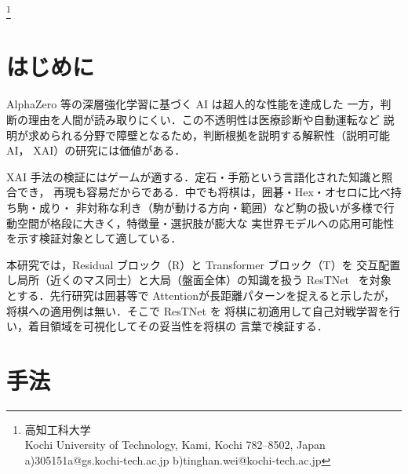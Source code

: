 \documentclass[a4paper,10pt,twocolumn]{ltjsarticle}
\newcommand{\blfootnote}[1]{%
  \begingroup
  \renewcommand\thefootnote{}\footnote{#1}%
  \addtocounter{footnote}{-1}%
  \endgroup}
\begin{document}

\blfootnote{\quad 高知工科大学\\
\phantom{1\quad}Kochi University of Technology, Kami, Kochi 782--8502, Japan\\
a)\quad 305151a@gs.kochi-tech.ac.jp\quad
b)\quad tinghan.wei@kochi-tech.ac.jp}

\section{はじめに}
AlphaZero 等の深層強化学習に基づく AI は超人的な性能を達成した
一方，判断の理由を人間が読み取りにくい．この不透明性は医療診断や自動運転など
説明が求められる分野で障壁となるため，判断根拠を説明する解釈性（説明可能 AI，
XAI）の研究には価値がある．

XAI 手法の検証にはゲームが適する．定石・手筋という言語化された知識と照合でき，
再現も容易だからである．中でも将棋は，囲碁・Hex・オセロに比べ持ち駒・成り・
非対称な利き（駒が動ける方向・範囲）など駒の扱いが多様で行動空間が格段に大きく，特徴量・選択肢が膨大な
実世界モデルへの応用可能性を示す検証対象として適している．

本研究では，Residual ブロック（R）と Transformer ブロック（T）を
交互配置し局所（近くのマス同士）と大局（盤面全体）の知識を扱う ResTNet~\cite{restnet} を対象とする．先行研究は囲碁等で
Attentionが長距離パターンを捉えると示したが，将棋への適用例は無い．そこで ResTNet を
将棋に初適用して自己対戦学習を行い，着目領域を可視化してその妥当性を将棋の
言葉で検証する．

\section{手法}
\end{document}
